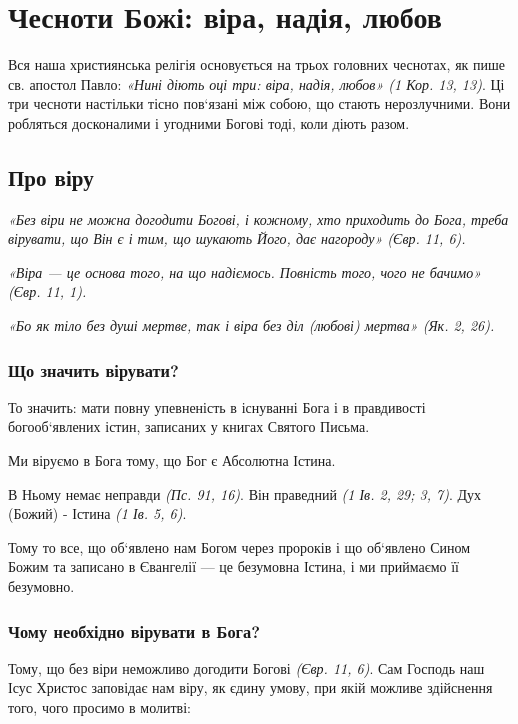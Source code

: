 \documentclass[main.tex]{subfiles}
\begin{document}
\chapter{Чесноти Божі: віра, надія, любов}
Вся наша християнська релігія основується на трьох головних чеснотах, як пише св. апостол Павло: \emph{«Нині діють оці три: віра, надія, любов» (1 Кор. 13, 13)}. Ці три чесноти настільки тісно пов`язані між собою, що стають нерозлучними. Вони робляться досконалими і угодними Богові тоді, коли діють разом.
\section{Про віру}
\begin{FlushRight}
    \emph{«Без віри не можна догодити Богові, і кожному, хто приходить до Бога, треба вірувати, що Він є і тим, що шукають Його, дає нагороду» (Євр. 11, 6).}
\end{FlushRight}
\begin{FlushRight}
    \emph{«Віра — це основа того, на що надіємось. Повність того, чого не бачимо» (Євр. 11, 1).}
\end{FlushRight}
\begin{FlushRight}
    \emph{«Бо як тіло без душі мертве, так і віра без діл (любові) мертва» (Як. 2, 26).}
\end{FlushRight}

\subsection{Що значить вірувати?}
То значить: мати повну упевненість в існуванні Бога і в правдивості богооб`явлених істин, записаних у книгах Святого Письма.

Ми віруємо в Бога тому, що Бог є Абсолютна Істина.
 
В Ньому немає неправди \emph{(Пс. 91, 16)}. Він праведний \emph{(1 Ів. 2, 29; 3, 7)}. Дух (Божий) - Істина \emph{(1 Ів. 5, 6)}.

Тому то все, що об`явлено нам Богом через пророків і що об`явлено Сином Божим та записано в Євангелії — це безумовна Істина, і ми приймаємо її безумовно.

\subsection{Чому необхідно вірувати в Бога?}

Тому, що без віри неможливо догодити Богові \emph{(Євр. 11, 6)}. Сам Господь наш Ісус Христос заповідає нам віру, як єдину умову, при якій можливе здійснення того, чого просимо в молитві:
\end{document}
